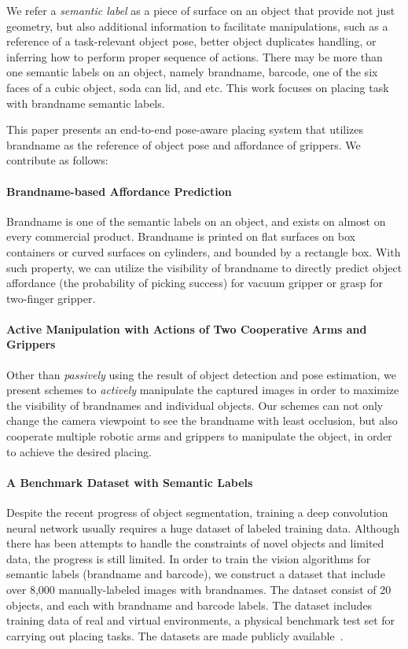 We refer a \emph{semantic label} as a piece of surface on an object that provide not just geometry, but also additional information to facilitate manipulations, such as a reference of a task-relevant object pose, better object duplicates handling, or inferring how to perform proper sequence of actions. There may be more than one semantic labels on an object, namely brandname, barcode, one of the six faces of a cubic object, soda can lid, and etc. This work focuses on placing task with brandname semantic labels.

This paper presents an end-to-end pose-aware placing system that utilizes brandname as the reference of object pose and affordance of grippers. We contribute as follows:

\paragraph{Brandname-based Affordance Prediction} Brandname is one of the semantic labels on an object, and exists on almost on every commercial product. Brandname is printed on flat surfaces on box containers or curved surfaces on cylinders, and bounded by a rectangle box. With such property, we can utilize the visibility of brandname to directly predict object affordance (the probability of picking success) for vacuum gripper or grasp for two-finger gripper.

\paragraph{Active Manipulation with Actions of Two Cooperative Arms and Grippers} Other than \emph{passively} using the result of object detection and pose estimation, we present schemes to \emph{actively} manipulate the captured images in order to maximize the visibility of brandnames and individual objects. Our schemes can not only change the camera viewpoint to see the brandname with least occlusion, but also cooperate multiple robotic arms and grippers to manipulate the object, in order to achieve the desired placing.

\paragraph{A Benchmark Dataset with Semantic Labels} Despite the recent progress of object segmentation, training a deep convolution neural network usually requires a huge dataset of labeled training data. Although there has been attempts to handle the constraints of novel objects and limited data, the progress is still limited. In order to train the vision algorithms for semantic labels (brandname and barcode), we construct a dataset that include over 8,000 manually-labeled images with brandnames. The dataset consist of 20 objects, and each with brandname and barcode labels. The dataset includes training data of real and virtual environments, a physical benchmark test set for carrying out placing tasks. The datasets are made publicly available~\cite{textpnp}.


